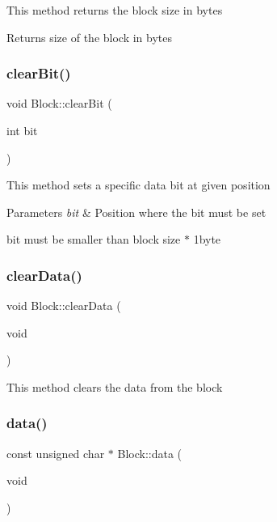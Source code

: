 This method returns the block size in bytes

\begin{DoxyReturn}{Returns}
size of the block in bytes 
\end{DoxyReturn}
\mbox{\label{classlogic_1_1_block_aaf20f779418e0491c626e009f1e66bb9}} 
\subsubsection{\texorpdfstring{clear\+Bit()}{clearBit()}}
{\footnotesize\ttfamily void Block\+::clear\+Bit (\begin{DoxyParamCaption}\item[{int}]{bit }\end{DoxyParamCaption})}

This method sets a specific data bit at given position


\begin{DoxyParams}{Parameters}
{\em bit} & Position where the bit must be set\\
\hline
\end{DoxyParams}
bit must be smaller than block size $\ast$ 1byte \mbox{\label{classlogic_1_1_block_aa63e9635221bda7c6660a5c254510e78}} 
\subsubsection{\texorpdfstring{clear\+Data()}{clearData()}}
{\footnotesize\ttfamily void Block\+::clear\+Data (\begin{DoxyParamCaption}\item[{void}]{ }\end{DoxyParamCaption})}

This method clears the data from the block \mbox{\label{classlogic_1_1_block_a2c8b08fd7d36f82b34b7d89268f2da4f}} 
\subsubsection{\texorpdfstring{data()}{data()}}
{\footnotesize\ttfamily const unsigned char $\ast$ Block\+::data (\begin{DoxyParamCaption}\item[{void}]{ }\end{DoxyParamCaption})}

